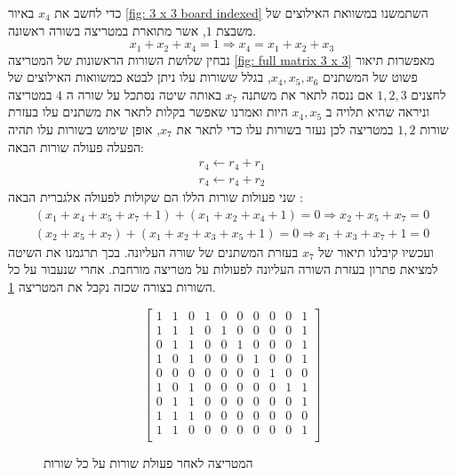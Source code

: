 \documentclass[12pt,leqno]{article}
\theoremstyle{theoremdd}
\begin{document}
כדי לחשב את 
$x_4$
באיור
\ref{fig: 3 x 3 board indexed}
השתמשנו במשוואת האילוצים של 
משבצת 
$1$,
אשר מתוארת במטריצה בשורה ראשונה.
\[
    x_1 + x_2 + x_4 = 1 \Rightarrow x_4 = x_1 + x_2 + x_3
\]
נבחין שלושת השורות הראשונות  
של המטריצה 
\ref{fig: full matrix 3 x 3}
מאפשרות תיאור פשוט של המשתנים 
$x_4, x_5, x_6$,
בגלל ששורות עלו ניתן לבטא כמשוואות האילוצים של לחצנים 
$1,2,3$
אם ננסה לתאר 
את משתנה 
$x_7$
באותה שיטה 
נסתכל על שורה ה 
$4$
במטריצה 
וניראה שהיא תלויה ב
$x_4, x_5$
היות ואמרנו
שאפשר בקלות לתאר את משתנים עלו 
בעזרת שורות 
$1,2$
במטריצה לכן 
נעזר בשורות עלו כדי לתאר את 
$x_7$,
אופן שימוש בשורות עלו תהיה 
הפעלה פעולה שורות הבאה:
\begin{align*}
    r_4 \leftarrow r_4 + r_1
    \\
    r_4 \leftarrow r_4 + r_2
\end{align*}
שני פעולות שורות הללו הם שקולות לפעולה אלגברית הבאה
:
\begin{align*}
   (x_1 + x_4 + x_5 + x_7 + 1) + (x_1 + x_2 + x_4 + 1) = 0 \Rightarrow x_2 + x_5 + x_7 = 0
    \\
    (x_2 + x_5 + x_7) + (x_1 + x_2 + x_3 + x_5 + 1 ) = 0 \Rightarrow x_1 + x_3 + x_7 + 1 = 0
\end{align*}
ועכשיו קיבלנו תיאור 
של 
$x_7$
בעזרת המשתנים של שורה העליונה.
בכך תרגמנו את השיטה למציאת פתרון בעזרת השורה העליונה לפעולות על מטריצה מורחבת.
אחרי שנעבור על כל השורות בצורה שכזה נקבל את המטריצה
\ref{fig: matrix after spanish}.
\begin{figure}[ht]
    \caption{המטריצה לאחר פעולת שורות על כל שורות}
    \label{fig: matrix after spanish}
    \begin{english}
        \begin{center}
            \[
                \left[
                \begin{array}{ccccccccc|c}
                1& 1& 0& 1& 0& 0& 0& 0& 0& 1 \\
                1& 1& 1& 0& 1& 0& 0& 0& 0& 1 \\
                0& 1& 1& 0& 0& 1& 0& 0& 0& 1 \\
                1& 0& 1& 0& 0& 0& 1& 0& 0& 1\\
                0& 0& 0& 0& 0& 0& 0& 1& 0& 0\\
                1& 0& 1& 0& 0& 0& 0& 0& 1& 1\\
                0& 1& 1& 0& 0& 0& 0& 0& 0& 1\\
                1& 1& 1& 0& 0& 0& 0& 0& 0& 0\\
                1& 1& 0& 0& 0& 0& 0& 0& 0& 1\\
            \end{array}
            \right]
            \]
        \end{center}       
    \end{english}
\end{figure}
\end{document}
